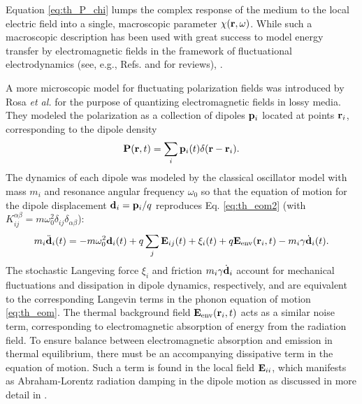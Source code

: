 Equation \eqref{eq:th_P_chi} lumps the complex response of the medium to the local electric field into a single, macroscopic parameter $\chi(\mathbf{r},\omega)$. While such a macroscopic description has been used with great success to model energy transfer by electromagnetic fields in the framework of fluctuational electrodynamics \cite{rytov} (see, e.g., Refs. \cite{joulain05} and \cite{volokitin07} for reviews),  \cite{chalopin12b}. 


A more microscopic model for fluctuating polarization fields was introduced by Rosa \textit{et al.} \cite{rosa10,rosa11} for the purpose of quantizing electromagnetic fields in lossy media. They modeled the polarization as a collection of dipoles $\mathbf{p}_i$ located at points $\mathbf{r}_i$, corresponding to the dipole density
\begin{equation}
 \mathbf{P}(\mathbf{r},t) = \sum_i \mathbf{p}_i(t) \delta(\mathbf{r}-\mathbf{r}_i).
\end{equation}
The dynamics of each dipole was modeled by the classical oscillator model with mass $m_i$ and resonance angular frequency $\omega_0$ so that the equation of motion for the dipole displacement $\mathbf{d}_i=\mathbf{p}_i/q$ reproduces Eq. \eqref{eq:th_eom2} (with $K_{ij}^{\alpha\beta}=m\omega_0^2\delta_{ij}\delta_{\alpha\beta}$): \cite{rosa10,rosa11}
\begin{equation}
 m_i \ddot{\mathbf{d}}_i(t) = - m \omega_0^2 \mathbf{d}_i(t) +q\sum_{j} \mathbf{E}_{ij}(t)+\xi_i(t)+ q\mathbf{E}_{\textrm{env}}(\mathbf{r}_i,t) - m_i \gamma \dot{\mathbf{d}}_i(t). \label{eq:th_eom2b}
\end{equation}
The stochastic Langeving force $\xi_i$ and friction $m_i\gamma \dot{\mathbf{d}}_i$ account for mechanical fluctuations and dissipation in dipole dynamics, respectively, and are equivalent to the corresponding Langevin terms in the phonon equation of motion \eqref{eq:th_eom}. The thermal background field $\mathbf{E}_{\textrm{env}}(\mathbf{r}_i,t)$ acts as a similar noise term, corresponding to electromagnetic absorption of energy from the radiation field. To ensure balance between electromagnetic absorption and emission in thermal equilibrium, there must be an accompanying dissipative term in the equation of motion. Such a term is found in the local field $\mathbf{E}_{ii}$, which manifests as Abraham-Lorentz radiation damping in the dipole motion \cite{jackson} as discussed in more detail in . %

